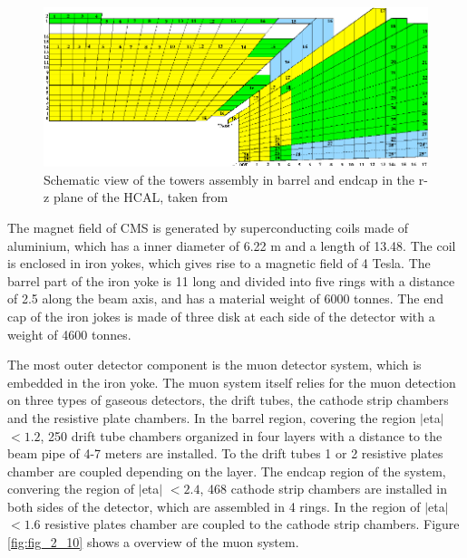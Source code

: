 \begin{figure}[ht]
	\centering
	\includegraphics[width=1\textwidth]{pictures/HCAL.pdf}

	\caption[Hadronic calorimeter of CMS]{Schematic view of the towers assembly in barrel and endcap in the r-z plane of the \gls{HCAL}, taken from \cite{CMS2}}
	\label{fig:fig_2_9}
\end{figure}

The magnet field of \gls{CMS} is generated by superconducting coils made of aluminium, which has a inner diameter of 6.22 m and a length of 13.48. The coil is enclosed in iron yokes, which gives rise to a magnetic field of 4 Tesla. The barrel part of the iron yoke is 11 long and divided into five rings with a distance of 2.5 along the beam axis, and has a material weight of 6000 tonnes. The end cap of the iron jokes is made of three disk at each side of the detector with a weight of 4600 tonnes.

The most outer detector component is the muon detector system, which is embedded in the iron yoke. The muon system itself relies for the muon detection on three types of gaseous detectors, the drift tubes, the cathode strip chambers and the resistive plate chambers. In the barrel region, covering the region $|$\gls{eta}$|$ $< 1.2$, 250 drift tube chambers organized in four layers with a distance to the beam pipe of 4-7 meters are installed. To the drift tubes 1 or 2 resistive plates chamber are coupled depending on the layer. The endcap region of the system, convering the region of $|$\gls{eta}$|$ $< 2.4$, 468 cathode strip chambers are installed in both sides of the detector, which are assembled in 4 rings. In the region of $|$\gls{eta}$|$ $< 1.6$  resistive plates chamber are coupled to the cathode strip chambers. Figure \ref{fig:fig_2_10} shows a overview of the muon system.

